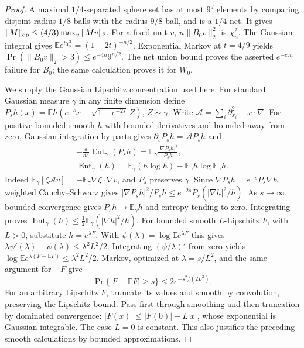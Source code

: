 \begin{proof}
A maximal \(1/4\)-separated sphere set has at most \(9^d\) elements by
comparing disjoint radius-\(1/8\) balls with the radius-\(9/8\) ball,
and is a \(1/4\) net. It gives \(\|M\|_{\rm op}\le(4/3)\max_v\|Mv\|_2\).
For a fixed unit \(v\), \(n\|B_0v\|_2^2\) is \(\chi_n^2\). The Gaussian
integral gives \(\mathbb E e^{t\chi_n^2}=(1-2t)^{-n/2}\). Exponential
Markov at \(t=4/9\) yields \(\Pr(\|B_0v\|_2>3)\le e^{-4n}9^{n/2}\). The
net union bound proves the asserted \(e^{-c_*n}\) failure for \(B_0\);
the same calculation proves it for \(W_0\).

We supply the Gaussian Lipschitz concentration used here. For standard
Gaussian measure \(\gamma\) in any finite dimension define
\(P_s h(x)=\mathbb E h(e^{-s}x+\sqrt{1-e^{-2s}}\,Z)\),
\(Z\sim\gamma\). Write
\(\mathscr A=\sum_i\partial_{x_i}^2-x\cdot\nabla\). For positive bounded
smooth \(h\) with bounded derivatives and bounded away from zero,
Gaussian integration by parts gives \(\partial_sP_sh=\mathscr A P_sh\)
and \[\begin{gathered}
-\frac{d}{ds}\operatorname{Ent}_\gamma(P_sh)
=\mathbb E_\gamma\frac{|\nabla P_sh|^2}{P_sh},\qquad\\
\operatorname{Ent}_\gamma(h)=
\mathbb E_\gamma(h\log h)-\mathbb E_\gamma h\log\mathbb E_\gamma h.
\end{gathered}\] Indeed \(\mathbb E_\gamma[\zeta\mathscr A v]
=-\mathbb E_\gamma\nabla \zeta\cdot\nabla v\), and \(P_s\) preserves
\(\gamma\). Since \(\nabla P_sh=e^{-s}P_s\nabla h\), weighted
Cauchy--Schwarz gives
\(|\nabla P_sh|^2/P_sh\le e^{-2s}P_s(|\nabla h|^2/h)\). As
\(s\to\infty\), bounded convergence gives \(P_sh\to\mathbb E_\gamma h\)
and entropy tending to zero. Integrating proves
\(\operatorname{Ent}_\gamma(h)\le\frac12\mathbb E_\gamma(|\nabla h|^2/h)\).
For bounded smooth \(L\)-Lipschitz \(F\), with \(L>0\), substitute
\(h=e^{\lambda F}\). With \(\psi(\lambda)=\log\mathbb E e^{\lambda F}\)
this gives \(\lambda\psi'(\lambda)-\psi(\lambda)\le\lambda^2L^2/2\).
Integrating \((\psi/\lambda)'\) from zero yields
\(\log\mathbb E e^{\lambda(F-\mathbb EF)}\le\lambda^2L^2/2\). Markov,
optimized at \(\lambda=s/L^2\), and the same argument for \(-F\) give
\begin{equation}\label{cp:nth:eq:gaussian-tail}{
\Pr\{|F-\mathbb EF|\ge s\}\le2e^{-s^2/(2L^2)}.
}\end{equation} For an arbitrary Lipschitz \(F\), truncate its values
and smooth by convolution, preserving the Lipschitz bound. Pass first
through smoothing and then truncation by dominated convergence:
\(|F(x)|\le|F(0)|+L|x|\), whose exponential is Gaussian-integrable. The
case \(L=0\) is constant. This also justifies the preceding smooth
calculations by bounded approximations.


\end{proof}
